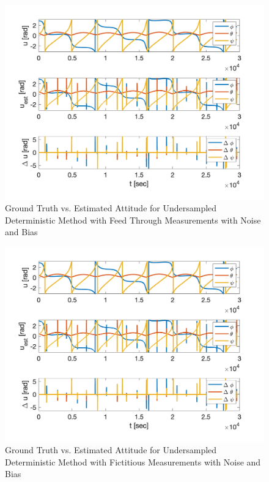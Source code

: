 \begin{figure}[H]
    \centering
    \captionsetup{ justification = centering }
    \includegraphics[width = 12cm]{Images/PS7/attitude_estimation_undersampled_det_default.png}
    \caption{Ground Truth vs. Estimated Attitude for Undersampled Deterministic Method with Feed Through Measurements with Noise and Bias}
    \label{fig:det_attitude_undersampled_default_noise}
\end{figure}

\begin{figure}[H]
    \centering
    \captionsetup{ justification = centering }
    \includegraphics[width = 12cm]{Images/PS7/attitude_estimation_undersampled_det_fictitious.png}
    \caption{Ground Truth vs. Estimated Attitude for Undersampled Deterministic Method with Fictitious Measurements with Noise and Bias}
    \label{fig:det_attitude_undersampled_fictitious_noise}
\end{figure}

